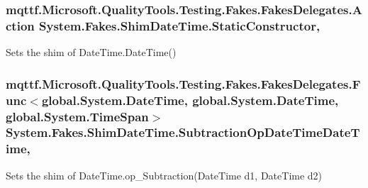 \hypertarget{class_system_1_1_fakes_1_1_shim_date_time_a501f3eccd011392e0424f080ef57eb91}{
\subsubsection[{Static\-Constructor}]{\setlength{\rightskip}{0pt plus 5cm}mqttf.\-Microsoft.\-Quality\-Tools.\-Testing.\-Fakes.\-Fakes\-Delegates.\-Action System.\-Fakes.\-Shim\-Date\-Time.\-Static\-Constructor\hspace{0.3cm}{\ttfamily [static]}, {\ttfamily [set]}}}\label{class_system_1_1_fakes_1_1_shim_date_time_a501f3eccd011392e0424f080ef57eb91}


Sets the shim of Date\-Time.\-Date\-Time()

\hypertarget{class_system_1_1_fakes_1_1_shim_date_time_ae49e34170688a781ced9a67c1f7df3ec}{
\subsubsection[{Subtraction\-Op\-Date\-Time\-Date\-Time}]{\setlength{\rightskip}{0pt plus 5cm}mqttf.\-Microsoft.\-Quality\-Tools.\-Testing.\-Fakes.\-Fakes\-Delegates.\-Func$<$global.\-System.\-Date\-Time, global.\-System.\-Date\-Time, global.\-System.\-Time\-Span$>$ System.\-Fakes.\-Shim\-Date\-Time.\-Subtraction\-Op\-Date\-Time\-Date\-Time\hspace{0.3cm}{\ttfamily [static]}, {\ttfamily [set]}}}\label{class_system_1_1_fakes_1_1_shim_date_time_ae49e34170688a781ced9a67c1f7df3ec}


Sets the shim of Date\-Time.\-op\-\_\-\-Subtraction(\-Date\-Time d1, Date\-Time d2)

